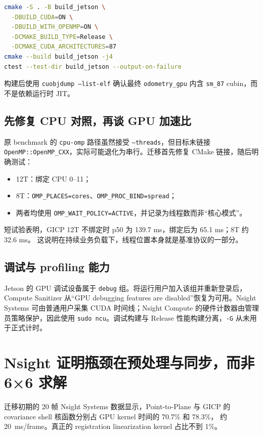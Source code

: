 \documentclass[UTF8,a4paper,11pt,fontset=none]{ctexart}
\begin{document}
\begin{lstlisting}[style=reportcode,language=bash]
cmake -S . -B build_jetson \
  -DBUILD_CUDA=ON \
  -DBUILD_WITH_OPENMP=ON \
  -DCMAKE_BUILD_TYPE=Release \
  -DCMAKE_CUDA_ARCHITECTURES=87
cmake --build build_jetson -j4
ctest --test-dir build_jetson --output-on-failure
\end{lstlisting}

构建后使用 \texttt{cuobjdump --list-elf} 确认最终 \texttt{odometry\_gpu} 内含
\texttt{sm\_87} cubin，而不是依赖运行时 JIT。

\subsection{先修复 CPU 对照，再谈 GPU 加速比}

原 benchmark 的 \texttt{cpu-omp} 路径虽然接受 \texttt{--threads}，但目标未链接
\texttt{OpenMP::OpenMP\_CXX}，实际可能退化为串行。迁移首先修复 CMake 链接，随后明确测试：

\begin{itemize}
  \item 12T：绑定 CPU 0--11；
  \item 8T：\texttt{OMP\_PLACES=cores}、\texttt{OMP\_PROC\_BIND=spread}；
  \item 两者均使用 \texttt{OMP\_WAIT\_POLICY=ACTIVE}，并记录为线程数而非“核心模式”。
\end{itemize}

短试验表明，GICP 12T 不绑定时 p50 为 139.7 ms，绑定后为 65.1 ms；8T 约 32.6 ms。
这说明在持续业务负载下，线程位置本身就是基准协议的一部分。

\subsection{调试与 profiling 能力}

Jetson 的 GPU 调试设备属于 \texttt{debug} 组。将运行用户加入该组并重新登录后，
Compute Sanitizer 从“GPU debugging features are disabled”恢复为可用。Nsight Systems
可由普通用户采集 CUDA 时间线；Nsight Compute 的硬件计数器由管理员策略保护，因此使用
\texttt{sudo ncu}。调试构建与 Release 性能构建分离，\texttt{-G} 从未用于正式计时。

\section{Nsight 证明瓶颈在预处理与同步，而非 6×6 求解}

迁移初期的 20 帧 Nsight Systems 数据显示，Point-to-Plane 与 GICP 的
covariance shell 核函数分别占 GPU kernel 时间的 70.7\% 和 78.3\%，
约 \SI{20}{ms/frame}。真正的 registration linearization kernel 占比不到 1\%。
\end{document}
